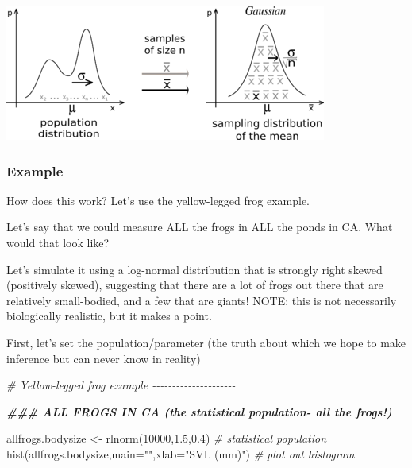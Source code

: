 \documentclass[
]{article}
\newenvironment{Shaded}{\begin{snugshade}}{\end{snugshade}}
\newcommand{\AttributeTok}[1]{\textcolor[rgb]{0.77,0.63,0.00}{#1}}
\newcommand{\CommentTok}[1]{\textcolor[rgb]{0.56,0.35,0.01}{\textit{#1}}}
\newcommand{\DecValTok}[1]{\textcolor[rgb]{0.00,0.00,0.81}{#1}}
\newcommand{\DocumentationTok}[1]{\textcolor[rgb]{0.56,0.35,0.01}{\textbf{\textit{#1}}}}
\newcommand{\FloatTok}[1]{\textcolor[rgb]{0.00,0.00,0.81}{#1}}
\newcommand{\FunctionTok}[1]{\textcolor[rgb]{0.00,0.00,0.00}{#1}}
\newcommand{\NormalTok}[1]{#1}
\newcommand{\OtherTok}[1]{\textcolor[rgb]{0.56,0.35,0.01}{#1}}
\newcommand{\StringTok}[1]{\textcolor[rgb]{0.31,0.60,0.02}{#1}}
\begin{document}
\includegraphics{clt1.png}

\hypertarget{example}{%
\subsubsection{Example}\label{example}}

How does this work? Let's use the yellow-legged frog example.

Let's say that we could measure ALL the frogs in ALL the ponds in CA.
What would that look like?

Let's simulate it using a log-normal distribution that is strongly right
skewed (positively skewed), suggesting that there are a lot of frogs out
there that are relatively small-bodied, and a few that are giants! NOTE:
this is not necessarily biologically realistic, but it makes a point.

First, let's set the population/parameter (the truth about which we hope
to make inference but can never know in reality)

\begin{Shaded}
\begin{Highlighting}[]
\CommentTok{\# Yellow{-}legged frog example {-}{-}{-}{-}{-}{-}{-}{-}{-}{-}{-}{-}{-}{-}{-}{-}{-}{-}{-}{-}{-}}

\DocumentationTok{\#\#\# ALL FROGS IN CA (the statistical population{-} all the frogs!)}

\NormalTok{allfrogs.bodysize }\OtherTok{\textless{}{-}} \FunctionTok{rlnorm}\NormalTok{(}\DecValTok{10000}\NormalTok{,}\FloatTok{1.5}\NormalTok{,}\FloatTok{0.4}\NormalTok{)        }\CommentTok{\# statistical \textquotesingle{}population\textquotesingle{}}
\FunctionTok{hist}\NormalTok{(allfrogs.bodysize,}\AttributeTok{main=}\StringTok{""}\NormalTok{,}\AttributeTok{xlab=}\StringTok{"SVL (mm)"}\NormalTok{)   }\CommentTok{\# plot out histogram}
\end{Highlighting}
\end{Shaded}
\end{document}
